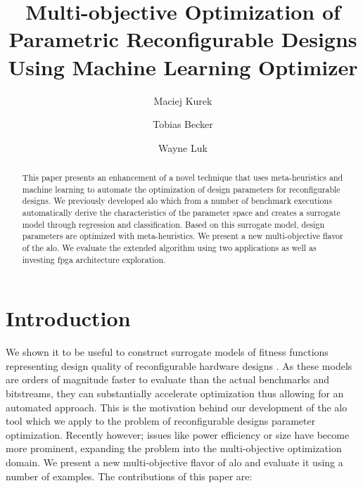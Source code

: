 \documentclass[10pt,conference,a4paper]{IEEEtran}
\begin{document}

\title{Multi-objective Optimization of Parametric Reconfigurable Designs Using Machine Learning Optimizer}


%
%
\author{Maciej Kurek \and Tobias Becker \and Wayne Luk}
%


\maketitle


\begin{abstract}

This paper presents an enhancement of a novel technique that uses meta-heuristics and machine learning to automate the optimization of design parameters for reconfigurable designs. We previously developed \ac{alo} which from a number of benchmark executions automatically derive the characteristics of the parameter space and creates a surrogate model through regression and classification. Based on this surrogate model, design parameters are optimized with meta-heuristics. We present a new multi-objective flavor of the \ac{alo}. We evaluate the extended algorithm using two applications as well as investing \ac{fpga} architecture exploration. 

\end{abstract}

\section{Introduction}

We shown it to be useful to construct surrogate models of fitness functions representing design quality of reconfigurable hardware designs \cite{fpt2012MLO,arc2012MLO}. As these models are orders of magnitude faster to evaluate than the actual benchmarks and bitstreams, they can substantially accelerate optimization thus allowing for an automated approach. This is the motivation behind our development of the \ac{alo} tool which we apply to the problem of reconfigurable designs parameter optimization. Recently however; issues like power efficiency or size have become more prominent, expanding the problem into the multi-objective optimization domain. We present a new multi-objective flavor of \ac{alo} and evaluate it using a number of examples. The contributions of this paper are: 
\end{document}
